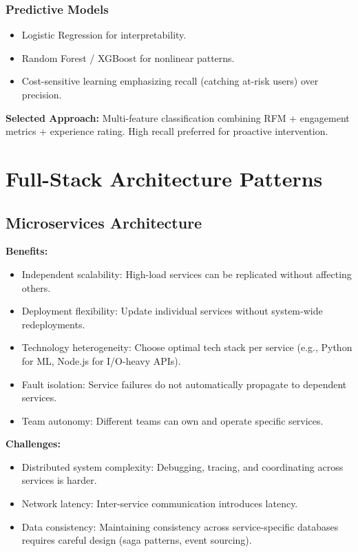 \documentclass[12pt,a4paper]{report}
\begin{document}
\subsubsection{Predictive Models}
\begin{itemize}
    \item Logistic Regression for interpretability.
    \item Random Forest / XGBoost for nonlinear patterns.
    \item Cost-sensitive learning emphasizing recall (catching at-risk users) over precision.
\end{itemize}

\textbf{Selected Approach:} Multi-feature classification combining RFM + engagement metrics + experience rating. High recall preferred for proactive intervention.

\section{Full-Stack Architecture Patterns}

\subsection{Microservices Architecture}

\textbf{Benefits:}
\begin{itemize}
    \item Independent scalability: High-load services can be replicated without affecting others.
    \item Deployment flexibility: Update individual services without system-wide redeployments.
    \item Technology heterogeneity: Choose optimal tech stack per service (e.g., Python for ML, Node.js for I/O-heavy APIs).
    \item Fault isolation: Service failures do not automatically propagate to dependent services.
    \item Team autonomy: Different teams can own and operate specific services.
\end{itemize}

\textbf{Challenges:}
\begin{itemize}
    \item Distributed system complexity: Debugging, tracing, and coordinating across services is harder.
    \item Network latency: Inter-service communication introduces latency.
    \item Data consistency: Maintaining consistency across service-specific databases requires careful design (saga patterns, event sourcing).
\end{itemize}
\end{document}
